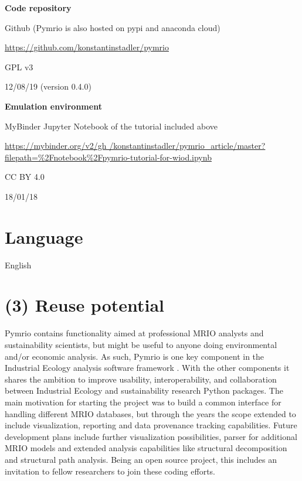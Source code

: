 \documentclass{jors}
\begin{document}
{\bf Code repository} 

\begin{description}[noitemsep,topsep=0pt]
    \item[Name:] Github (Pymrio is also hosted on pypi and anaconda cloud)
    \item[Persistent identifier:] \url{https://github.com/konstantinstadler/pymrio}
	\item[Licence:] GPL v3
    \item[Date published:] 12/08/19 (version 0.4.0)
\end{description}

{\bf Emulation environment} 

\begin{description}[noitemsep,topsep=0pt]
	\item[Name:] MyBinder Jupyter Notebook of the tutorial included above
    \item[Persistent identifier:] \url{https://mybinder.org/v2/gh /konstantinstadler/pymrio_article/master?filepath=%2Fnotebook%2Fpymrio-tutorial-for-wiod.ipynb}
        \item[Licence:] CC BY 4.0
	\item[Date published:] 18/01/18
\end{description}

\section*{Language}

English

\section*{(3) Reuse potential}

Pymrio contains functionality aimed at professional MRIO analysts and sustainability scientists, but might be useful to anyone doing environmental and/or economic analysis. 
As such, Pymrio is one key component in the Industrial Ecology analysis software framework \cite{pauliuk2015_Lifting}.
With the other components it shares the ambition to improve usability, interoperability, and collaboration between Industrial Ecology and sustainability research Python packages.
The main motivation for starting the project was to build a common interface for handling different MRIO databases, but through the years the scope extended to include visualization, reporting and data provenance tracking capabilities.
Future development plans include further visualization possibilities, parser for additional MRIO models and extended analysis capabilities like structural decomposition and structural path analysis.
Being an open source project, this includes an invitation to fellow researchers to join these coding efforts.
\end{document}
